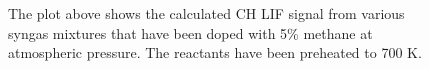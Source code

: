 \begin{figure}

\centering



\caption[Syngas-alkane flames - II]{The plot above shows the calculated CH LIF signal from various syngas mixtures that have been doped with 5\% methane at atmospheric pressure. The reactants have been preheated to 700 K.}

\label{fig:syngas-700}

\end{figure}
